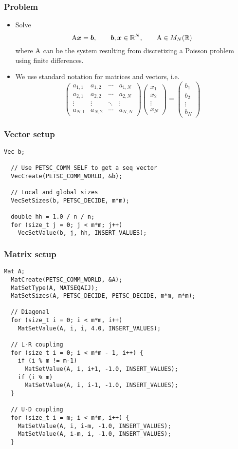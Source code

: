 \begin{frame}
  \frametitle{Problem}
  \begin{itemize}
  \item Solve
    \[
      {\mathrm A} \bm x = {\boldsymbol b}, \qquad
      {\boldsymbol b}, \bm x \in \mathbb{R}^N, \qquad
      {\mathrm A} \in {M_N(\mathbb{R})}
    \]
    where ${\mathrm A}$ can be the system resulting from discretizing a Poisson problem
    using finite differences.
  \bigskip
  \item We use standard notation for matrices and vectors, i.e.
    \[
      \begin{pmatrix}
        a_{1,1} & a_{1,2} & \cdots & a_{1,N} \\
        a_{2,1} & a_{2,2} & \cdots & a_{2,N} \\
        \vdots  & \vdots  & \ddots & \vdots  \\
        a_{N,1} & a_{N,2} & \cdots & a_{N,N}
      \end{pmatrix}
      \begin{pmatrix} x_1 \\ x_2 \\ \vdots \\ x_N \end{pmatrix} =
      \begin{pmatrix} b_1 \\ b_2 \\ \vdots \\ b_N \end{pmatrix}
    \]
  \end{itemize}
\end{frame}


\begin{frame}[fragile]
  \frametitle{Vector setup}
  \begin{lstlisting}[style=c]
  Vec b;

  // Use PETSC_COMM_SELF to get a seq vector
  VecCreate(PETSC_COMM_WORLD, &b);

  // Local and global sizes
  VecSetSizes(b, PETSC_DECIDE, m*m);

  double hh = 1.0 / n / n;
  for (size_t j = 0; j < m*m; j++)
    VecSetValue(b, j, hh, INSERT_VALUES);
  \end{lstlisting}
\end{frame}

\begin{frame}[fragile]
  \frametitle{Matrix setup}
  \begin{lstlisting}[style=c, basicstyle=\ttfamily\scriptsize]
  Mat A;
  MatCreate(PETSC_COMM_WORLD, &A);
  MatSetType(A, MATSEQAIJ);
  MatSetSizes(A, PETSC_DECIDE, PETSC_DECIDE, m*m, m*m);

  // Diagonal
  for (size_t i = 0; i < m*m, i++)
    MatSetValue(A, i, i, 4.0, INSERT_VALUES);

  // L-R coupling
  for (size_t i = 0; i < m*m - 1, i++) {
    if (i % m != m-1)
      MatSetValue(A, i, i+1, -1.0, INSERT_VALUES);
    if (i % m)
      MatSetValue(A, i, i-1, -1.0, INSERT_VALUES);
  }

  // U-D coupling
  for (size_t i = m; i < m*m, i++) {
    MatSetValue(A, i, i-m, -1.0, INSERT_VALUES);
    MatSetValue(A, i-m, i, -1.0, INSERT_VALUES);
  }
  \end{lstlisting}
\end{frame}


